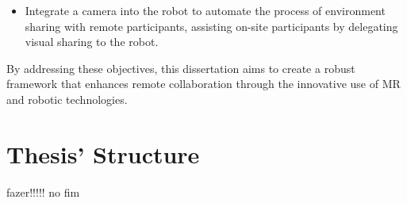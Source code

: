 \begin{itemize}
\begin{itemize}
        \item Integrate a camera into the robot to automate the process of environment sharing with remote participants, assisting on-site participants 
        by delegating visual sharing to the robot.
    \end{itemize}
\end{itemize}

By addressing these objectives, this dissertation aims to create a robust framework that enhances remote collaboration through the innovative use 
of \ac{MR} and robotic technologies.



\section{Thesis' Structure}
% 
fazer!!!!! no fim 
